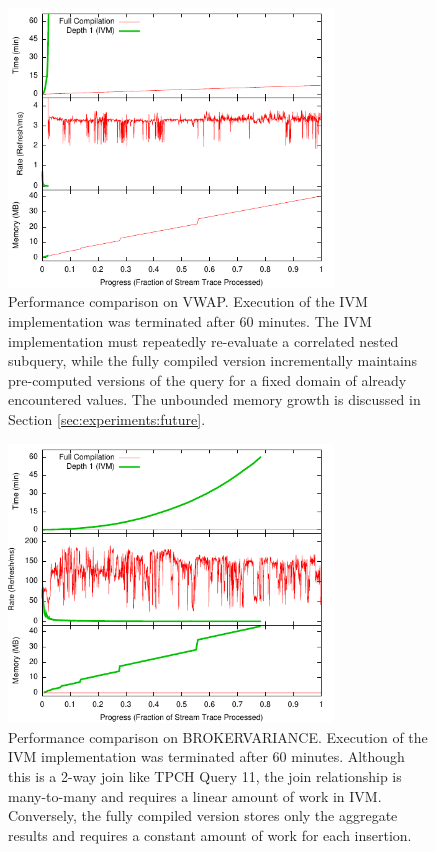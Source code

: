 \begin{figure}
\begin{center}
\includegraphics[width=3.4in]{../graphs/graphs/unified_vwap.pdf}
\caption{Performance comparison on VWAP.  Execution of the IVM implementation was terminated after 60 minutes.  The IVM implementation must repeatedly re-evaluate a correlated nested subquery, while the fully compiled version incrementally maintains pre-computed versions of the query for a fixed domain of already encountered values.  The unbounded memory growth is discussed in Section \ref{sec:experiments:future}.}
\label{fig:experiments:vwap}
\end{center}
\end{figure}

\begin{figure}
\begin{center}
\includegraphics[width=3.4in]{../graphs/graphs/unified_brokervariance.pdf}
\caption{Performance comparison on BROKERVARIANCE.  Execution of the IVM implementation was terminated after 60 minutes.  Although this is a 2-way join like TPCH Query 11, the join relationship is many-to-many and requires a linear amount of work in IVM.  Conversely, the fully compiled version stores only the aggregate results and requires a constant amount of work for each insertion.}
\label{fig:experiments:brokervariance}
\end{center}
\end{figure}

